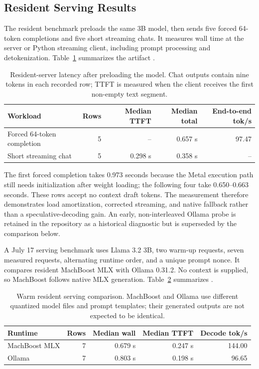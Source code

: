 \documentclass[11pt]{article}
\begin{document}
\subsection{Resident Serving Results}
The resident benchmark preloads the same 3B model, then sends five forced 64-token completions and five short streaming chats. It measures wall time at the server or Python streaming client, including prompt processing and detokenization. Table~\ref{tab:resident} summarizes the artifact .

\begin{table}[H]
\centering
\small
\begin{tabular}{lrrrr}
\toprule
Workload & Rows & Median TTFT & Median total & End-to-end tok/s \\
\midrule
Forced 64-token completion & 5 & -- & 0.657 s & 97.47 \\
Short streaming chat & 5 & 0.298 s & 0.358 s & -- \\
\bottomrule
\end{tabular}
\caption{Resident-server latency after preloading the model. Chat outputs contain nine tokens in each recorded row; TTFT is measured when the client receives the first non-empty text segment.}
\label{tab:resident}
\end{table}

The first forced completion takes 0.973 seconds because the Metal execution path still needs initialization after weight loading; the following four take 0.650--0.663 seconds. These rows accept no context draft tokens. The measurement therefore demonstrates load amortization, corrected streaming, and native fallback rather than a speculative-decoding gain. An early, non-interleaved Ollama probe is retained in the repository as a historical diagnostic but is superseded by the comparison below.

A July 17 serving benchmark uses Llama 3.2 3B, two warm-up requests, seven measured requests, alternating runtime order, and a unique prompt nonce. It compares resident MachBoost MLX with Ollama 0.31.2. No context is supplied, so MachBoost follows native MLX generation. Table~\ref{tab:ollamaserving} summarizes .

\begin{table}[H]
\centering
\small
\begin{tabular}{lrrrr}
\toprule
Runtime & Rows & Median wall & Median TTFT & Decode tok/s \\
\midrule
MachBoost MLX & 7 & 0.679 s & 0.247 s & 144.00 \\
Ollama & 7 & 0.803 s & 0.198 s & 96.65 \\
\bottomrule
\end{tabular}
\caption{Warm resident serving comparison. MachBoost and Ollama use different quantized model files and prompt templates; their generated outputs are not expected to be identical.}
\label{tab:ollamaserving}
\end{table}
\end{document}
